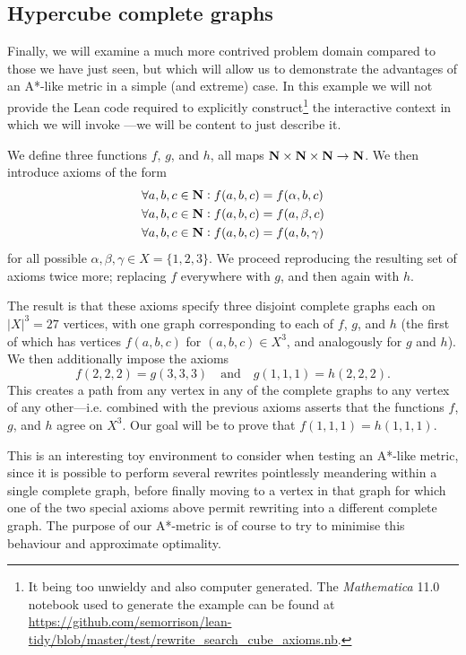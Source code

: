 \documentclass[12pt]{easychair}
\begin{document}
\subsection{Hypercube complete graphs}

Finally, we will examine a much more contrived problem domain compared to those we have just seen, but which will allow us to demonstrate the advantages of an A*-like metric in a simple (and extreme) case. In this example we will not provide the Lean code required to explicitly construct\footnote{It being too unwieldy and also computer generated. The \textit{Mathematica}\texttrademark{} 11.0 notebook used to generate the example can be found at \url{https://github.com/semorrison/lean-tidy/blob/master/test/rewrite_search_cube_axioms.nb}.} the interactive context in which we will invoke ---we will be content to just describe it.

We define three functions $f$, $g$, and $h$, all maps $\mathbf{N} \times \mathbf{N} \times \mathbf{N} \to \mathbf{N}$. We then introduce axioms of the form
\begin{align*}
  &\forall a, b, c \in \mathbf{N} : f(a, b, c) = f(\alpha, b, c)\\
  &\forall a, b, c \in \mathbf{N} : f(a, b, c) = f(a, \beta, c)\\
  &\forall a, b, c \in \mathbf{N} : f(a, b, c) = f(a, b, \gamma)
\end{align*}
for all possible $\alpha, \beta, \gamma \in X = \{1, 2, 3\}$. We proceed reproducing the resulting set of axioms twice more; replacing $f$ everywhere with $g$, and then again with $h$.

The result is that these axioms specify three disjoint complete graphs each on $\lvert X \rvert^3 = 27$ vertices, with one graph corresponding to each of $f$, $g$, and $h$ (the first of which has vertices $f(a, b, c)$ for $(a, b, c) \in X^3$, and analogously for $g$ and $h$). We then additionally impose the axioms
\begin{equation*}
f(2,2,2) = g(3,3,3) \quad \text{and} \quad g(1,1,1) = h(2,2,2).
\end{equation*}
This creates a path from any vertex in any of the complete graphs to any vertex of any other---i.e. combined with the previous axioms asserts that the functions $f$, $g$, and $h$ agree on $X^3$. Our goal will be to prove that $f(1,1,1) = h(1,1,1)$.

This is an interesting toy environment to consider when testing an A*-like metric, since it is possible to perform several rewrites pointlessly meandering within a single complete graph, before finally moving to a vertex in that graph for which one of the two special axioms above permit rewriting into a different complete graph. The purpose of our A*-metric is of course to try to minimise this behaviour and approximate optimality.
\end{document}
